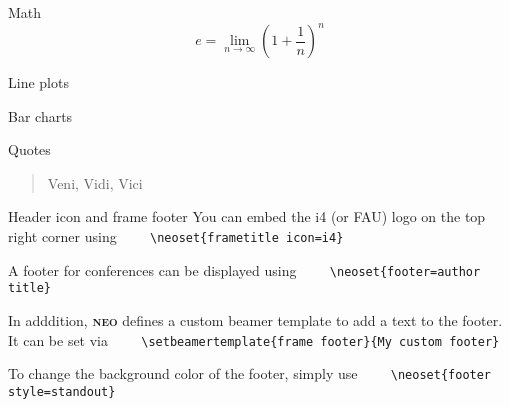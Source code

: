 \documentclass[10pt]{beamer}
\newcommand{\themename}{\textbf{\textsc{neo}}\xspace}
\begin{document}
\begin{frame}{Math}
  \begin{equation*}
    e = \lim_{n\to \infty} \left(1 + \frac{1}{n}\right)^n
  \end{equation*}
\end{frame}
\begin{frame}{Line plots}
  \begin{figure}
  \end{figure}
\end{frame}
\begin{frame}{Bar charts}
  \begin{figure}
  \end{figure}
\end{frame}
\begin{frame}{Quotes}
  \begin{quote}
    Veni, Vidi, Vici
  \end{quote}
\end{frame}

{%

\begin{frame}[fragile]{Header icon and frame footer}
    You can embed the i4 (or FAU) logo on the top right corner using
    \verb|    \neoset{frametitle icon=i4}|

    A footer for conferences can be displayed using
    \verb|    \neoset{footer=author title}|

    In adddition, \themename defines a custom beamer template to add a text to the footer. It can be set via
    \verb|    \setbeamertemplate{frame footer}{My custom footer}|

    To change the background color of the footer, simply use \verb|    \neoset{footer style=standout}|
\end{frame}
}
\end{document}
